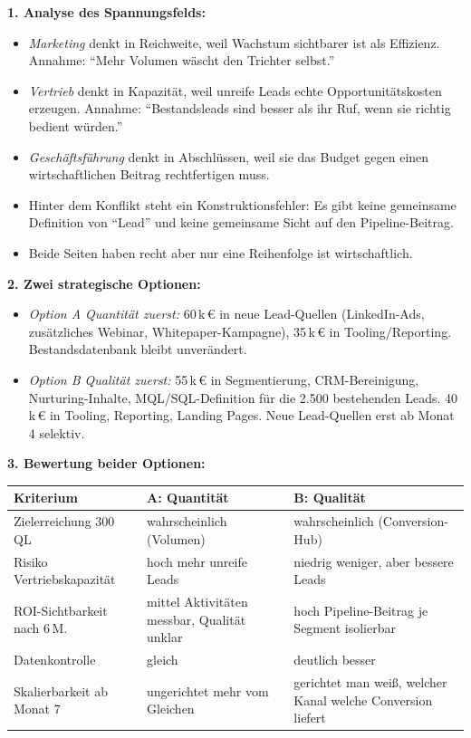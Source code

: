 \documentclass[11pt,a4paper,oneside]{article}
\begin{document}
\begin{loesungbox}
\textbf{1. Analyse des Spannungsfelds:}
\begin{itemize}
  \item \emph{Marketing} denkt in Reichweite, weil Wachstum sichtbarer ist als Effizienz. Annahme: ``Mehr Volumen wäscht den Trichter selbst.''
  \item \emph{Vertrieb} denkt in Kapazität, weil unreife Leads echte Opportunitätskosten erzeugen. Annahme: ``Bestandsleads sind besser als ihr Ruf, wenn sie richtig bedient würden.''
  \item \emph{Geschäftsführung} denkt in Abschlüssen, weil sie das Budget gegen einen wirtschaftlichen Beitrag rechtfertigen muss.
  \item Hinter dem Konflikt steht ein Konstruktionsfehler: Es gibt keine gemeinsame Definition von ``Lead'' und keine gemeinsame Sicht auf den Pipeline-Beitrag.
  \item Beide Seiten haben recht \textendash{} aber nur eine Reihenfolge ist wirtschaftlich.
\end{itemize}

\smallskip
\textbf{2. Zwei strategische Optionen:}
\begin{itemize}
  \item \emph{Option A \textendash{} Quantität zuerst:} 60\,k\,\euro{} in neue Lead-Quellen (LinkedIn-Ads, zusätzliches Webinar, Whitepaper-Kampagne), 35\,k\,\euro{} in Tooling/Reporting. Bestandsdatenbank bleibt unverändert.
  \item \emph{Option B \textendash{} Qualität zuerst:} 55\,k\,\euro{} in Segmentierung, CRM-Bereinigung, Nurturing-Inhalte, MQL/SQL-Definition für die 2.500 bestehenden Leads. 40\,k\,\euro{} in Tooling, Reporting, Landing Pages. Neue Lead-Quellen erst ab Monat 4 selektiv.
\end{itemize}

\smallskip
\textbf{3. Bewertung beider Optionen:}

\smallskip
\begin{tabularx}{\linewidth}{@{}lXX@{}}
\toprule
\textbf{Kriterium} & \textbf{A: Quantität} & \textbf{B: Qualität} \\
\midrule
Zielerreichung 300\,QL & wahrscheinlich (Volumen) & wahrscheinlich (Conversion-Hub) \\
Risiko Vertriebskapazität & hoch \textendash{} mehr unreife Leads & niedrig \textendash{} weniger, aber bessere Leads \\
ROI-Sichtbarkeit nach 6\,M.\ & mittel \textendash{} Aktivitäten messbar, Qualität unklar & hoch \textendash{} Pipeline-Beitrag je Segment isolierbar \\
Datenkontrolle & gleich & deutlich besser \\
Skalierbarkeit ab Monat 7 & ungerichtet \textendash{} mehr vom Gleichen & gerichtet \textendash{} man weiß, welcher Kanal welche Conversion liefert \\
\bottomrule
\end{tabularx}


\end{loesungbox}
\end{document}
